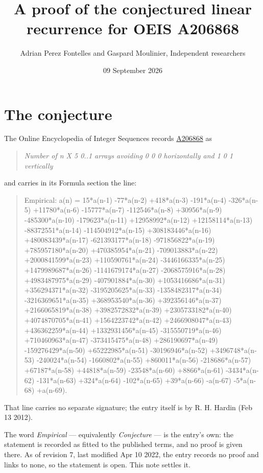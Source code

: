 \documentclass[11pt]{article}
\title{A proof of the conjectured linear recurrence for OEIS A206868}
\author{Adrian Perez Fontelles and Gaspard Moulinier, Independent researchers}
\date{09 September 2026}
\theoremstyle{definition}
\begin{document}
\maketitle
\section{The conjecture}

The Online Encyclopedia of Integer Sequences records \href{https://oeis.org/A206868}{A206868} as

\begin{quote}\itshape Number of n X 5 0..1 arrays avoiding 0 0 0 horizontally and 1 0 1 vertically\end{quote}

and carries in its Formula section the line:

\begin{quote}\ttfamily Empirical: a(n) = 15*a(n-1) -77*a(n-2) +418*a(n-3) -191*a(n-4) -326*a(n-5) +11780*a(n-6) -15777*a(n-7) -112546*a(n-8) +30956*a(n-9) -485300*a(n-10) -179623*a(n-11) +12958992*a(n-12) +12158114*a(n-13) -88372551*a(n-14) -114504912*a(n-15) +308183446*a(n-16) +480083439*a(n-17) -621393177*a(n-18) -971856822*a(n-19) +785957180*a(n-20) +470385954*a(n-21) -709013883*a(n-22) +2000841599*a(n-23) +110590761*a(n-24) -3446166335*a(n-25) +1479989687*a(n-26) -1141679174*a(n-27) -2068575916*a(n-28) +4983487975*a(n-29) -407901884*a(n-30) +1053416686*a(n-31) +356294371*a(n-32) -3195205625*a(n-33) -1358482317*a(n-34) -3216369651*a(n-35) +368953540*a(n-36) +392356146*a(n-37) +2166065819*a(n-38) +3982572832*a(n-39) +2305733182*a(n-40) +4074870705*a(n-41) +1564223742*a(n-42) +2466908047*a(n-43) +436362259*a(n-44) +1332931456*a(n-45) -315550719*a(n-46) +710460963*a(n-47) -373415475*a(n-48) +286190697*a(n-49) -159276429*a(n-50) +65222985*a(n-51) -30196946*a(n-52) +3496748*a(n-53) -240024*a(n-54) -1660802*a(n-55) +860011*a(n-56) -218686*a(n-57) +67187*a(n-58) +44818*a(n-59) -23548*a(n-60) +8866*a(n-61) -3434*a(n-62) -131*a(n-63) +324*a(n-64) -102*a(n-65) +39*a(n-66) -a(n-67) -5*a(n-68) +a(n-69).\end{quote}

That line carries no separate signature; the entry itself is by R. H. Hardin (Feb 13 2012).

The word {\itshape Empirical} --- equivalently {\itshape Conjecture} --- is the entry's own: the statement is recorded as fitted to the published terms, and no proof is given there. As of revision 7, last modified Apr 10 2022, the entry records no proof and links to none, so the statement is open. This note settles it.
\end{document}
